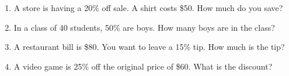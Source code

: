 \documentclass[12pt, letterpaper, fleqn]{article}
\begin{document}
\begin{enumerate}[itemsep=1.8cm, leftmargin=0.6cm]

\item A store is having a 20\% off sale. A shirt costs \$50. How much do you save?

\vspace{1.5cm}

\item In a class of 40 students, 50\% are boys. How many boys are in the class?

\vspace{1.5cm}

\item A restaurant bill is \$80. You want to leave a 15\% tip. How much is the tip?

\vspace{1.5cm}

\item A video game is 25\% off the original price of \$60. What is the discount?

\vspace{1.5cm}

\end{enumerate}
\end{document}
